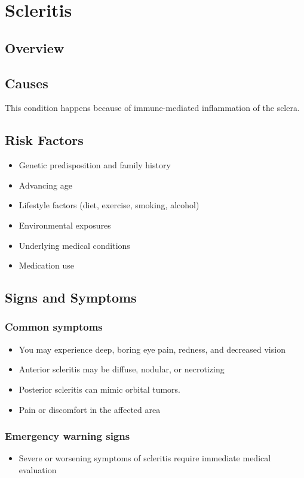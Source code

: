 \chapter{Scleritis}
\label{sec:Scleritis}

\section{Overview}

\section{Causes}
This condition happens because of immune-mediated inflammation of the sclera.     
\section{Risk Factors}

\begin{itemize}[noitemsep]
  \item Genetic predisposition and family history
  \item Advancing age
  \item Lifestyle factors (diet, exercise, smoking, alcohol)
  \item Environmental exposures
  \item Underlying medical conditions
  \item Medication use
\end{itemize}
\section{Signs and Symptoms}

\subsection{Common symptoms}
\begin{itemize}[noitemsep]
  \item You may experience deep, boring eye pain, redness, and decreased vision
  \item Anterior scleritis may be diffuse, nodular, or necrotizing
  \item Posterior scleritis can mimic orbital tumors.
  \item Pain or discomfort in the affected area
  \end{itemize}

\subsection{Emergency warning signs}
\begin{itemize}[noitemsep]
  \item Severe or worsening symptoms of scleritis require immediate medical evaluation
\end{itemize}
